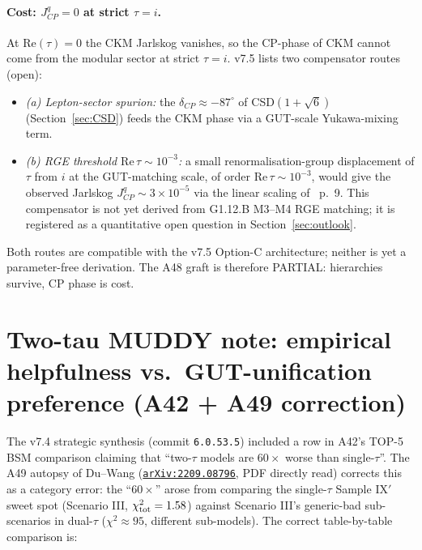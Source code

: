 \documentclass[a4paper,11pt]{article}
\newcommand{\arXiv}[1]{\href{https://arxiv.org/abs/#1}{\texttt{arXiv:#1}}}
\theoremstyle{definition}
\theoremstyle{remark}
\begin{document}
\paragraph{Cost: $J_{CP}^{q}=0$ at strict $\tau=i$.}  At
$\mathrm{Re}(\tau)=0$ the CKM Jarlskog vanishes, so the
CP-phase of CKM cannot come from the modular sector at strict
$\tau=i$.  v7.5 lists two compensator routes (open):
\begin{itemize}
  \item \emph{(a) Lepton-sector spurion:} the
    $\delta_{CP}\approx -87^{\circ}$ of CSD$(1+\sqrt 6)$
    (Section~\ref{sec:CSD}) feeds the CKM phase via a
    GUT-scale Yukawa-mixing term.
  \item \emph{(b) RGE threshold $\mathrm{Re}\,\tau\sim 10^{-3}$:}
    a small renormalisation-group displacement of $\tau$ from
    $i$ at the GUT-matching scale, of order
    $\mathrm{Re}\,\tau\sim 10^{-3}$, would give the observed
    Jarlskog $J_{CP}^{q}\sim 3\times 10^{-5}$ via the linear
    scaling of \cite{dMVP26}~p.~9.  This compensator is not yet
    derived from G1.12.B M3--M4 RGE matching; it is registered
    as a quantitative open question in
    Section~\ref{sec:outlook}.
\end{itemize}
Both routes are compatible with the v7.5 Option-C architecture;
neither is yet a parameter-free derivation.  The A48 graft is
therefore PARTIAL: hierarchies survive, CP phase is cost.

\section{Two-tau MUDDY note: empirical helpfulness vs.\
         GUT-unification preference (A42 + A49 correction)}
\label{sec:two-tau}

The v7.4 strategic synthesis (commit \texttt{6.0.53.5})
included a row in A42's TOP-5 BSM comparison claiming that
``two-$\tau$ models are $60\times$ worse than single-$\tau$''.
The A49 autopsy of Du--Wang \cite{DuWang22} (\arXiv{2209.08796},
PDF directly read) corrects this as a category error: the
``$60\times$'' arose from comparing the single-$\tau$ Sample
IX$'$ sweet spot (Scenario III, $\chi^2_{\rm tot}=1.58$) against
Scenario III's generic-bad sub-scenarios in dual-$\tau$
($\chi^2\approx 95$, different sub-models).  The correct
table-by-table comparison is:
\end{document}
